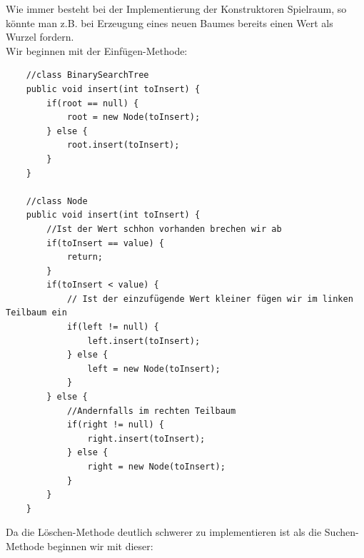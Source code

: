 \documentclass{article}
\begin{document}
Wie immer besteht bei der Implementierung der Konstruktoren Spielraum, so könnte man z.B. bei Erzeugung eines neuen Baumes bereits einen Wert als Wurzel fordern. \\
Wir beginnen mit der Einfügen-Methode:
\begin{verbatim}
    //class BinarySearchTree 
    public void insert(int toInsert) {
        if(root == null) {
            root = new Node(toInsert);
        } else {
            root.insert(toInsert);
        }
    }

    //class Node
    public void insert(int toInsert) {
        //Ist der Wert schhon vorhanden brechen wir ab
        if(toInsert == value) {
            return;
        }
        if(toInsert < value) {
            // Ist der einzufügende Wert kleiner fügen wir im linken Teilbaum ein
            if(left != null) {
                left.insert(toInsert);
            } else {
                left = new Node(toInsert);
            }
        } else {
            //Andernfalls im rechten Teilbaum
            if(right != null) {
                right.insert(toInsert);
            } else {
                right = new Node(toInsert);
            }
        }
    }
\end{verbatim}

Da die Löschen-Methode deutlich schwerer zu implementieren ist als die Suchen-Methode beginnen wir mit dieser:
\end{document}

